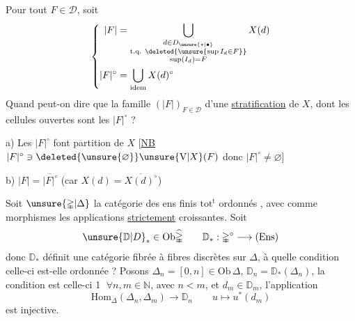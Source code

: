 Pour tout $F\in\mathscr D$, soit
\[
\left\{\begin{aligned}
|F|&=\bigcup_{\substack{d\in D_{\unsure{*|\bullet}}\\
\text{t.q. }\deleted{\unsure{\sup I_d\in F}}\\ \sup(I_d)=F}}X(d)\\
|F|^{\circ}&=\bigcup_{\text{idem}}X(d)^{\circ}
\end{aligned}\right.
\]
Quand peut-on dire que la famille  $(|F|)_{F\in\mathscr D}$
  d'une \uline{stratification} de $X$, dont les cellules ouvertes sont les $|F|^{\circ}$ ?

a) Les $|F|^{\circ}$  font partition de $X$
[\uline{NB} $|F|^{\circ}\ni\deleted{\unsure{\varnothing}}\unsure{\mathrm{V}|X}(F)$
 donc $|F|^{\circ}\ne\varnothing$]

b) $|F|=\overline{|F|^{\circ}}$ (car $X(d)=\overline{X(d)^{\circ}}$) 

Soit $\unsure{\mathbb{\Delta}|\Delta}$ la catégorie des ens finis $\mathrm{tot}^{\mathrm t}$ ordonnés , avec comme morphismes les applications \uline{strictement} croissantes.
Soit
\[
\unsure{\mathbb D|D}_{*}\in\mathrm{Ob}\widehat{\mathbb{\Delta}}
\qquad \mathbb D_*:\mathbb{\Delta}^{\circ}\longrightarrow(\mathrm{Ens})
\]
donc $\mathbb D_*$ définit une catégorie fibrée à fibres discrètes sur $\mathbb{\Delta}$, à quelle condition celle-ci est-elle ordonnée  ? Posons $\Delta_n=[0,n]\in\mathrm{Ob}\,\mathbb{\Delta}$, $\mathbb D_n=\mathbb D_*(\Delta_n)$, la condition est celle-ci
\textcircled{1} $\forall n,m\in\mathbb N$, avec $n<m$, et $d_m\in\mathbb D_m$, l'application
\[
\mathrm{Hom}_{\mathbb{\Delta}}(\Delta_n,\Delta_m)\longrightarrow\mathbb D_n
\qquad u\longmapsto u^*(d_m)
\]
est injective.

